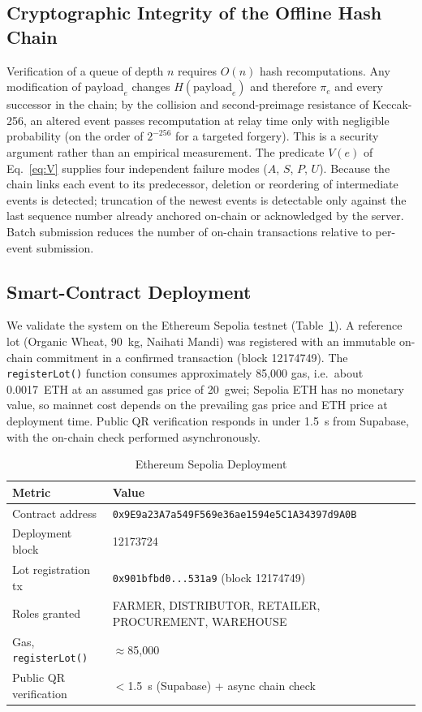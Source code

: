 \documentclass[conference,a4paper]{IEEEtran}
\begin{document}
\subsection{Cryptographic Integrity of the Offline Hash Chain}
Verification of a queue of depth $n$ requires $O(n)$ hash recomputations. Any modification of $\mathrm{payload}_e$ changes $H(\mathrm{payload}_e)$ and therefore $\pi_e$ and every successor in the chain; by the collision and second-preimage resistance of Keccak-256, an altered event passes recomputation at relay time only with negligible probability (on the order of $2^{-256}$ for a targeted forgery). This is a security argument rather than an empirical measurement. The predicate $V(e)$ of Eq.~\eqref{eq:V} supplies four independent failure modes ($A$, $S$, $P$, $U$). Because the chain links each event to its predecessor, deletion or reordering of intermediate events is detected; truncation of the newest events is detectable only against the last sequence number already anchored on-chain or acknowledged by the server. Batch submission reduces the number of on-chain transactions relative to per-event submission.

\subsection{Smart-Contract Deployment}
\label{sec:deploy}
We validate the system on the Ethereum Sepolia testnet (Table~\ref{tab:deploy}). A reference lot (Organic Wheat, 90~kg, Naihati Mandi) was registered with an immutable on-chain commitment in a confirmed transaction (block 12174749). The \texttt{registerLot()} function consumes approximately 85{,}000 gas, i.e.\ about 0.0017~ETH at an assumed gas price of 20~gwei; Sepolia ETH has no monetary value, so mainnet cost depends on the prevailing gas price and ETH price at deployment time. Public QR verification responds in under 1.5~s from Supabase, with the on-chain check performed asynchronously.

\begin{table}[!t]
\caption{Ethereum Sepolia Deployment}
\label{tab:deploy}
\centering\footnotesize
\begin{tabularx}{\columnwidth}{@{}l X@{}}
\toprule
Metric & Value\\
\midrule
Contract address & \texttt{\scriptsize 0x9E9a23A7a549F569e36ae1594e5C1A34397d9A0B}\\
Deployment block & 12173724\\
Lot registration tx & \texttt{\scriptsize 0x901bfbd0...531a9} (block 12174749)\\
Roles granted & FARMER, DISTRIBUTOR, RETAILER, PROCUREMENT, WAREHOUSE\\
Gas, \texttt{registerLot()} & $\approx$85{,}000\\
Public QR verification & $<$1.5~s (Supabase) + async chain check\\
\bottomrule
\end{tabularx}
\end{table}
\end{document}
